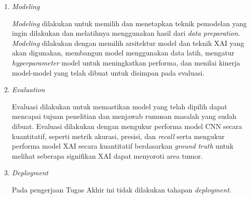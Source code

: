 \begin{enumerate}
	\item	\textit{Modeling}
	
	\textit{Modeling} dilakukan untuk memilih dan menetapkan teknik pemodelan yang ingin dilakukan dan melatihnya menggunakan hasil dari \textit{data preparation}. \textit{Modeling} dilakukan dengan memilih arsitektur model dan teknik XAI yang akan digunakan, membangun model menggunakan data latih, mengatur \textit{hyperparameter} model untuk meningkatkan performa, dan menilai kinerja model-model yang telah dibuat untuk disimpan pada evaluasi.
	
	\item	\textit{Evaluation}
	
	Evaluasi dilakukan untuk memastikan model yang telah dipilih dapat mencapai tujuan penelitian dan menjawab rumusan masalah yang sudah dibuat. Evaluasi dilakukan dengan mengukur performa model CNN secara kuantitatif, seperti metrik akurasi, presisi, dan \textit{recall} serta mengukur performa model XAI secara kuantitatif berdasarkan \textit{ground truth} untuk melihat seberapa signifikan XAI dapat menyoroti area tumor.
	
	
	\item	\textit{Deployment}
	
	Pada pengerjaan Tugas Akhir ini tidak dilakukan tahapan \textit{deployment}.
	
\end{enumerate}

